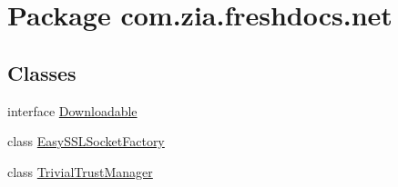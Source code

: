 \hypertarget{namespacecom_1_1zia_1_1freshdocs_1_1net}{\section{Package com.\-zia.\-freshdocs.\-net}
\label{namespacecom_1_1zia_1_1freshdocs_1_1net}
}
\subsection*{Classes}
\begin{DoxyCompactItemize}
\item 
interface \hyperlink{interfacecom_1_1zia_1_1freshdocs_1_1net_1_1_downloadable}{Downloadable}
\item 
class \hyperlink{classcom_1_1zia_1_1freshdocs_1_1net_1_1_easy_s_s_l_socket_factory}{Easy\-S\-S\-L\-Socket\-Factory}
\item 
class \hyperlink{classcom_1_1zia_1_1freshdocs_1_1net_1_1_trivial_trust_manager}{Trivial\-Trust\-Manager}
\end{DoxyCompactItemize}

